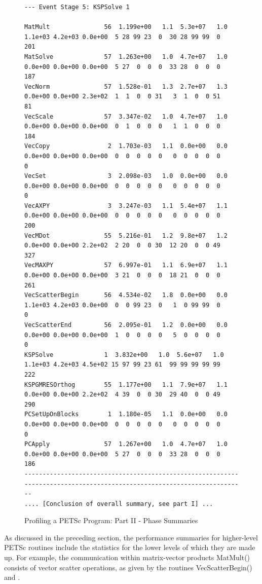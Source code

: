 \begin{figure}[tb]
{\begin{verbatim}
--- Event Stage 5: KSPSolve 1

MatMult               56  1.199e+00   1.1  5.3e+07   1.0  1.1e+03 4.2e+03 0.0e+00  5 28 99 23  0  30 28 99 99  0   201
MatSolve              57  1.263e+00   1.0  4.7e+07   1.0  0.0e+00 0.0e+00 0.0e+00  5 27  0  0  0  33 28  0  0  0   187
VecNorm               57  1.528e-01   1.3  2.7e+07   1.3  0.0e+00 0.0e+00 2.3e+02  1  1  0  0 31   3  1  0  0 51    81
VecScale              57  3.347e-02   1.0  4.7e+07   1.0  0.0e+00 0.0e+00 0.0e+00  0  1  0  0  0   1  1  0  0  0   184
VecCopy                2  1.703e-03   1.1  0.0e+00   0.0  0.0e+00 0.0e+00 0.0e+00  0  0  0  0  0   0  0  0  0  0     0
VecSet                 3  2.098e-03   1.0  0.0e+00   0.0  0.0e+00 0.0e+00 0.0e+00  0  0  0  0  0   0  0  0  0  0     0
VecAXPY                3  3.247e-03   1.1  5.4e+07   1.1  0.0e+00 0.0e+00 0.0e+00  0  0  0  0  0   0  0  0  0  0   200
VecMDot               55  5.216e-01   1.2  9.8e+07   1.2  0.0e+00 0.0e+00 2.2e+02  2 20  0  0 30  12 20  0  0 49   327
VecMAXPY              57  6.997e-01   1.1  6.9e+07   1.1  0.0e+00 0.0e+00 0.0e+00  3 21  0  0  0  18 21  0  0  0   261
VecScatterBegin       56  4.534e-02   1.8  0.0e+00   0.0  1.1e+03 4.2e+03 0.0e+00  0  0 99 23  0   1  0 99 99  0     0
VecScatterEnd         56  2.095e-01   1.2  0.0e+00   0.0  0.0e+00 0.0e+00 0.0e+00  1  0  0  0  0   5  0  0  0  0     0
KSPSolve              1  3.832e+00   1.0  5.6e+07   1.0  1.1e+03 4.2e+03 4.5e+02 15 97 99 23 61  99 99 99 99 99   222
KSPGMRESOrthog        55  1.177e+00   1.1  7.9e+07   1.1  0.0e+00 0.0e+00 2.2e+02  4 39  0  0 30  29 40  0  0 49   290
PCSetUpOnBlocks        1  1.180e-05   1.1  0.0e+00   0.0  0.0e+00 0.0e+00 0.0e+00  0  0  0  0  0   0  0  0  0  0     0
PCApply               57  1.267e+00   1.0  4.7e+07   1.0  0.0e+00 0.0e+00 0.0e+00  5 27  0  0  0  33 28  0  0  0   186
------------------------------------------------------------------------------------------------------------------------
.... [Conclusion of overall summary, see part I] ...
\end{verbatim}
}
\caption{Profiling a PETSc Program: Part II - Phase Summaries}
\label{fig_exparprof2}
\end{figure}

As discussed in the preceding section, the performance summaries for
higher-level PETSc routines include the statistics for the lower
levels of which they are made up.  For example, the communication within
matrix-vector products MatMult() consists of vector scatter
operations, as given by the routines VecScatterBegin() and . 
%
%

